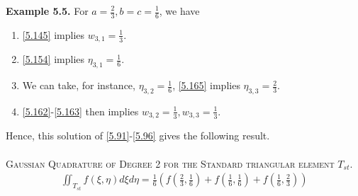 \documentclass[a4paper]{article}
\numberwithin{equation}{section}
\begin{document}
\textbf{Example 5.5.} For $a = \frac{2}{3},b = c = \frac{1}{6}$, we have
\begin{enumerate}
\item \eqref{5.145} implies ${w_{3,1}} = \frac{1}{3}$.
\item \eqref{5.154} implies ${\eta _{3,1}} = \frac{1}{6}$.
\item We can take, for instance, ${\eta _{3,2}} = \frac{1}{6}$, \eqref{5.165} implies ${\eta _{3,3}} = \frac{2}{3}$.
\item \eqref{5.162}-\eqref{5.163} then implies ${w_{3,2}} = \frac{1}{3},{w_{3,3}} = \frac{1}{3}$.
\end{enumerate}
Hence, this solution of \eqref{5.91}-\eqref{5.96} gives the following result.\\
\\
\textsc{Gaussian Quadrature of Degree 2 for the Standard triangular element $T_{st}$.}
\begin{align}
\iint_{{T_{st}}} {f\left( {\xi ,\eta } \right)d\xi d\eta } = \frac{1}{6}\left( {f\left( {\frac{2}{3},\frac{1}{6}} \right) + f\left( {\frac{1}{6},\frac{1}{6}} \right) + f\left( {\frac{1}{6},\frac{2}{3}} \right)} \right)
\end{align}
\end{document}

